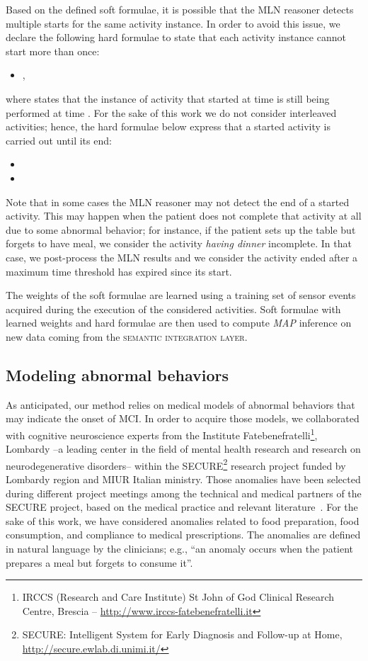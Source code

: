 \documentclass[10pt, conference, compsocconf]{IEEEtran}
\begin{document}
Based on the defined soft formulae, it is possible that the MLN reasoner detects multiple starts for the same activity instance. In order to avoid this issue, we declare the following hard formulae to state that each activity instance cannot start more than once:
\begin{itemize}
\item ,
\end{itemize}
where  states that the instance of activity  that started at 
time  is still being performed at time . 
For the sake of this work we do not consider interleaved activities; hence, the hard formulae 
below express that a started activity is carried out until its end:
\begin{itemize}
\item 
\item  
\end{itemize}


Note that in some cases the MLN reasoner may not detect the end of a started activity. This may happen when the patient does not complete that activity at all due to some abnormal behavior; for instance, if the patient sets up the table but forgets to have meal, we consider the activity \emph{having dinner} incomplete. In that case, we post-process the MLN results and we consider the activity ended after a maximum time threshold has expired since its start.

The weights of the soft formulae are learned using a training set of sensor events acquired during the execution of the considered activities. Soft formulae with learned weights and hard formulae are then used to compute \emph{MAP} inference on new data coming from the \textsc{semantic integration layer}. 




 

\subsection{Modeling abnormal behaviors}
\label{subsec:mab}
As anticipated, our method relies on medical models of abnormal behaviors that may indicate the onset of MCI. 
In order to acquire those models, we collaborated with cognitive neuroscience experts from the Institute Fatebenefratelli\footnote{IRCCS (Research and Care Institute) St John of God Clinical
Research Centre, Brescia -- \url{http://www.irccs-fatebenefratelli.it}}, Lombardy --a leading center in the field of mental health research and research on neurodegenerative disorders-- within the SECURE\footnote{SECURE: Intelligent System for Early Diagnosis and Follow-up at Home, \url{http://secure.ewlab.di.unimi.it/}} research project funded by Lombardy region and MIUR Italian ministry. 
Those anomalies have been selected during different project meetings among the technical and medical partners of the SECURE project, based on the medical practice and relevant literature~\cite{scales}. For the sake of this work, we have considered anomalies related to food preparation, food consumption, and compliance to medical prescriptions. The anomalies are defined in natural language by the clinicians; e.g., ``an anomaly occurs when the patient prepares a meal but forgets to consume it''.
\end{document}

